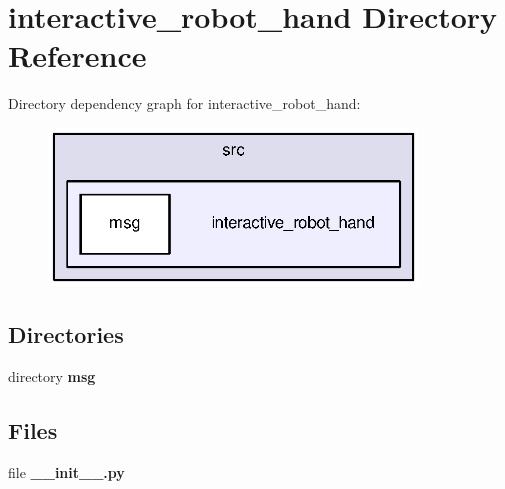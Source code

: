 \section{interactive\-\_\-robot\-\_\-hand Directory Reference}
\label{dir_b3cead9d98e5288e0150d401e793ab73}
Directory dependency graph for interactive\-\_\-robot\-\_\-hand\-:
\nopagebreak
\begin{figure}[H]
\begin{center}
\leavevmode
\includegraphics[width=278pt]{dir_b3cead9d98e5288e0150d401e793ab73_dep}
\end{center}
\end{figure}
\subsection*{Directories}
\begin{DoxyCompactItemize}
\item 
directory {\bf msg}
\end{DoxyCompactItemize}
\subsection*{Files}
\begin{DoxyCompactItemize}
\item 
file {\bf \-\_\-\-\_\-init\-\_\-\-\_\-.\-py}
\end{DoxyCompactItemize}
